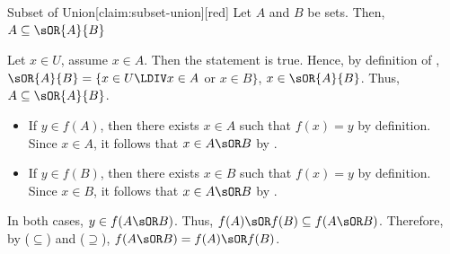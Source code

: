 \begin{enumerate}
\begin{enumerate}
\begin{subprove}
\begin{define}{Subset of Union}[claim:subset-union][red]
        Let $A$ and $B$ be sets. Then, $A \subseteq \sOR{A}{B}$
        \begin{subprove}[red]
          Let $x\in U$, assume $x\in A$. Then the statement  is true.
          Hence, by definition of , $\sOR{A}{B}=\{x\in U\LDIV x\in A$ or $x\in B\}$, $x\in \sOR{A}{B}$.
          Thus, $A \subseteq \sOR{A}{B}$.
        \end{subprove}
      \end{define}
      \begin{itemize}
        \item If $y \in f(A)$, then there exists $x \in A$ such that $f(x) = y$ by definition.
        Since $x \in A$, it follows that $x \in A \sOR B$ by .
        \item If $y \in f(B)$, then there exists $x \in B$ such that $f(x) = y$ by definition.
        Since $x \in B$, it follows that $x \in A \sOR B$ by .
      \end{itemize}
      In both cases, $y \in f(A \sOR B)$.
      Thus, $f(A) \sOR f(B) \subseteq f(A \sOR B)$.\proofstep
      Therefore, by ($\subseteq$) and ($\supseteq$), $f(A \sOR B)=f(A) \sOR f(B)$.
    \end{subprove}


\end{enumerate}
\end{enumerate}
